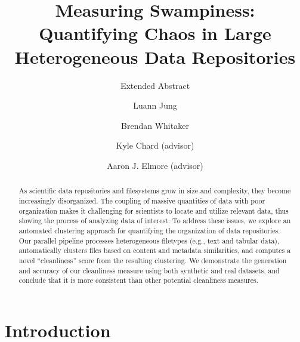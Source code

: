 \documentclass[sigconf,screen]{acmart}
\begin{document}
\title{Measuring Swampiness: Quantifying Chaos in Large Heterogeneous Data Repositories}
\subtitle{Extended Abstract}

\author{Luann Jung}

\author{Brendan Whitaker}

\author{Kyle Chard (advisor)}

\author{Aaron J. Elmore (advisor)}

\renewcommand{\shortauthors}{Measuring Swampiness: Quantifying Chaos in Large Heterogeneous Data Repositories}

\begin{abstract}
As scientific data repositories and filesystems grow in size and complexity, they become increasingly disorganized. The coupling of massive quantities of data with poor organization makes it challenging for scientists to locate and utilize relevant data, thus slowing the process of analyzing data of interest. To address these issues, we explore an automated clustering approach for quantifying the organization of data repositories. Our parallel pipeline processes heterogeneous filetypes (e.g., text and tabular data), automatically clusters files based on content and metadata similarities, and computes a novel ``cleanliness'' score from the resulting clustering. We demonstrate the generation and accuracy of our cleanliness measure using both synthetic and real datasets, and conclude that it is more consistent than other potential cleanliness measures.
\end{abstract}

\maketitle

\section{Introduction}

\end{document}
